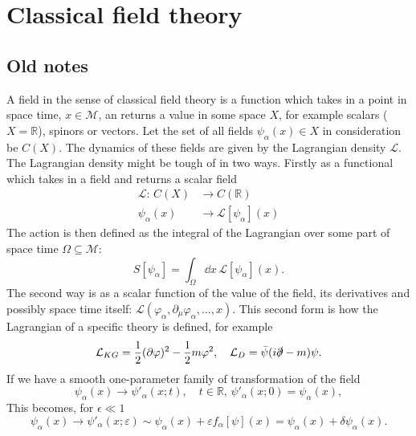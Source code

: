 



\section{Classical field theory}



\subsection{Old notes}


A field in the sense of classical field theory is a function which takes in a point in space time, $x \in \mathcal{M}$, an returns a value in some space $X$, for example scalars ($X = \mathbb{R}$), spinors or vectors.
Let the set of all fields $\psi_\alpha(x) \in X$ in consideration be $C(X)$.
The dynamics of these fields are given by the Lagrangian density $\mathcal{L}$.
The Lagrangian density might be tough of in two ways.
Firstly as a functional which takes in a field and returns a scalar field
\begin{align*}
    \mathcal{L}: \, C(X) &\longrightarrow C(\mathbb{R})\\
    \psi_\alpha(x) & \longrightarrow \mathcal{L}[\psi_\alpha](x)
\end{align*}
The action is then defined as the integral of the Lagrangian over some part of space time $\Omega \subseteq \mathcal{M}$:
\begin{equation*}
    S[\psi_\alpha] = \int_\Omega \dd x \, \mathcal{L}[\psi_\alpha](x).
\end{equation*}
The second way is as a scalar function of the value of the field, its derivatives and possibly space time itself: $\mathcal{L}(\varphi_\alpha, \partial_\mu \varphi_\alpha, ..., x)$.
This second form is how the Lagrangian of a specific theory is defined, for example
\begin{equation*}
    \mathcal{L}_{KG} = \frac{1}{2}(\partial \varphi)^2 - \frac{1}{2} m \varphi^2, \quad \mathcal{L}_{D} = \bar \psi (i \slashed \partial - m) \psi.
\end{equation*}
If we have a smooth one-parameter family of transformation of the field
\begin{equation*}
    \psi_\alpha(x) \longrightarrow \psi'_\alpha(x; t), \quad t \in \mathbb{R}, \, \psi'_\alpha(x; 0) = \psi_\alpha(x),
\end{equation*}
This becomes, for $\epsilon \ll 1$
\begin{equation*}
    \psi_\alpha(x) \longrightarrow \psi'_\alpha(x; \varepsilon) \sim \psi_\alpha(x) + \varepsilon f_\alpha[\psi](x) = \psi_\alpha(x) + \delta \psi_\alpha(x).
\end{equation*}
